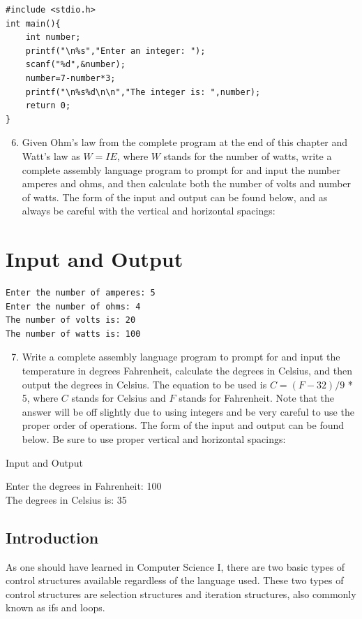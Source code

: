 \documentclass[10pt]{book}
\begin{document}
\begin{verbatim}
#include <stdio.h>
int main(){
    int number;
    printf("\n%s","Enter an integer: ");
    scanf("%d",&number);
    number=7-number*3;
    printf("\n%s%d\n\n","The integer is: ",number);
    return 0;
}
\end{verbatim}

\begin{enumerate}
  \setcounter{enumi}{5}
  \item Given Ohm's law from the complete program at the end of this chapter and Watt's law as $W=I E$, where $W$ stands for the number of watts, write a complete assembly language program to prompt for and input the number amperes and ohms, and then calculate both the number of volts and number of watts. The form of the input and output can be found below, and as always be careful with the vertical and horizontal spacings:
\end{enumerate}

\section{Input and Output}
\begin{verbatim}
Enter the number of amperes: 5
Enter the number of ohms: 4
The number of volts is: 20
The number of watts is: 100
\end{verbatim}

\begin{enumerate}
  \setcounter{enumi}{6}
  \item Write a complete assembly language program to prompt for and input the temperature in degrees Fahrenheit, calculate the degrees in Celsius, and then output the degrees in Celsius. The equation to be used is $C=(F-32) / 9$ * 5, where $C$ stands for Celsius and $F$ stands for Fahrenheit. Note that the answer will be off slightly due to using integers and be very careful to use the proper order of operations. The form of the input and output can be found below. Be sure to use proper vertical and horizontal spacings:
\end{enumerate}

Input and Output

Enter the degrees in Fahrenheit: 100\\
The degrees in Celsius is: 35

\subsection{Introduction}
As one should have learned in Computer Science I, there are two basic types of control structures available regardless of the language used. These two types of control structures are selection structures and iteration structures, also commonly known as ifs and loops.
\end{document}
